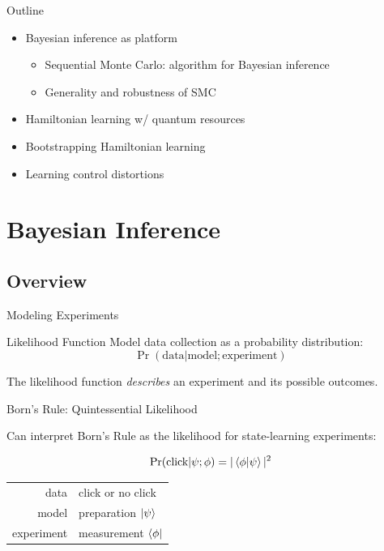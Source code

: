 \documentclass[xcolor=dvipsnames, compress]{beamer}
\begin{document}
\begin{frame}{Outline}

  \begin{itemize}[<+->]
    \item Bayesian inference as platform
    \begin{itemize}
      \item Sequential Monte Carlo: algorithm for Bayesian inference
      \item Generality and robustness of SMC
    \end{itemize}
    \item Hamiltonian learning w/ quantum resources
    \item Bootstrapping Hamiltonian learning
    \item Learning control distortions
  \end{itemize}

\end{frame}

\section[Bayes]{Bayesian Inference}
\subsection{Overview}

\begin{frame}{Modeling Experiments}

  \begin{block}{Likelihood Function}
  Model data collection as a probability distribution:
    $$\Pr(\text{data} | \text{model}; \text{experiment})$$
  \end{block}

  \pause

  The likelihood function \emph{describes} an experiment and its possible
  outcomes. 

\end{frame}

\begin{frame}{Born's Rule: Quintessential Likelihood}

    Can interpret Born's Rule as the likelihood for state-learning experiments:

    $$
      \Pr(\text{click} | \psi; \phi) = | \braket{\phi | \psi} |^2
    $$

    \pause

    \begin{center}
        \begin{tabular}{r|l}
                  data & click or no click \\
                 model & preparation $\ket{\psi}$ \\
            experiment & measurement $\bra{\phi}$
        \end{tabular}
    \end{center}

\end{frame}
\end{document}
